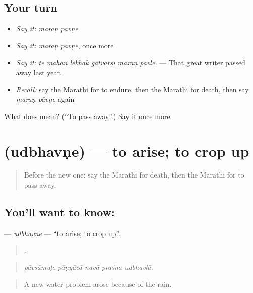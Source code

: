 \subsection*{Your turn}
\begin{itemize}
\raggedright
  \item \emph{Say it:} \emph{maraṇ pāvṇe}
  \item \emph{Say it:} \emph{maraṇ pāvṇe}, once more
  \item \emph{Say it:} \emph{te mahān lekhak gatvarṣī maraṇ pāvle.} — That great writer passed away last year.
  \item \emph{Recall:} say the Marathi for to endure, then the Marathi for death, then say \emph{maraṇ pāvṇe} again
\end{itemize}

\begin{tcolorbox}[breakable,colback=teal!4,colframe=teal!35!black,title={Before you move on}]
What does   mean? (\textquotedblleft{}To pass away\textquotedblright{}.) Say it once more.
\end{tcolorbox}
\section[\texorpdfstring{\mr{उद्भवणे} (udbhavṇe)}{उद्भवणे (udbhavṇe)}]{ (udbhavṇe) — to arise; to crop up}

\label{lesson:MR-C309-udbhavne}



\begin{quote}
Before the new one: say the Marathi for death, then the Marathi for to pass away.
\end{quote}

\subsection*{You'll want to know: }
\textbf{} — \emph{udbhavṇe} — \textquotedblleft{}to arise; to crop up\textquotedblright{}.

\begin{quote}
    .
\end{quote}

\begin{quote}
\emph{pāvsāmuḷe pāṇyācā navā praśna udbhavlā.}
\end{quote}

\begin{quote}
A new water problem arose because of the rain.
\end{quote}

